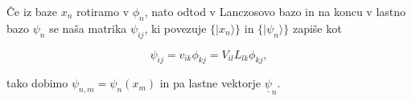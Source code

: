 \documentclass[a4 paper, 12pt]{article}
\begin{document}
Če iz baze $x_n$ rotiramo v $\phi_n$, nato odtod v Lanczosovo bazo in na koncu v lastno bazo $\psi_n$ se naša matrika $\psi_{ij}$, ki
povezuje $\big\{|x_n\rangle\big\}$ in $\big\{|\psi_n\rangle\big\}$ zapiše kot

\[
	\psi_{ij} = v_{ik} \phi_{kj} = V_{il} L_{lk} \phi_{kj},
\]

tako dobimo $\psi_{n,m} = \psi_n (x_m)$ in pa lastne vektorje $\underline{\psi}_n$.
\end{document}
